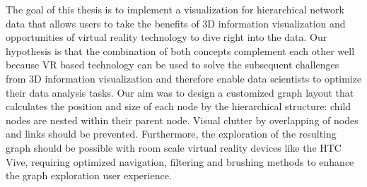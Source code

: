 The goal of this thesis is to implement a visualization for hierarchical network data that allows users to take the benefits of 3D information visualization and opportunities of virtual reality technology to dive right into the data. Our hypothesis is that the combination of both concepts complement each other well because VR based technology can be used to solve the subsequent challenges from 3D information visualization and therefore enable data scientists to optimize their data analysis tasks. 
Our aim was to design a customized graph layout that calculates the position and size of each node by the hierarchical structure: child nodes are nested within their parent node. 
Visual clutter by overlapping of nodes and links should be prevented. 
Furthermore, the exploration of the resulting graph should be possible with room scale virtual reality devices like the HTC Vive, requiring optimized navigation, filtering and brushing methods to enhance the graph exploration user experience.

